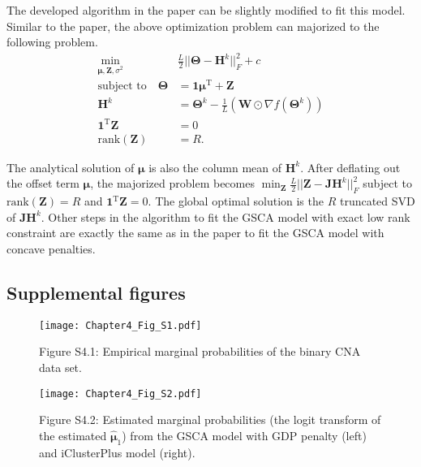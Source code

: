 The developed algorithm in the paper can be slightly modified to fit this model. Similar to the paper, the above optimization problem can majorized to the following problem.
\begin{equation*}
\begin{aligned}
          \min_{\bm{\mu},\mathbf{Z},\sigma^2} \quad & \frac{L}{2} ||\mathbf{\Theta} - \mathbf{H}^k||_F^2+ c\\
     \text{subject to} \quad   \mathbf{\Theta} &= \mathbf{1}\bm{\mu}^{\text{T}} + \mathbf{Z} \\
         \mathbf{H}^k &= \mathbf{\Theta}^k - \frac{1}{L} (\mathbf{W} \odot \nabla f(\mathbf{\Theta}^k))\\
            \mathbf{1}^{\text{T}}\mathbf{Z} &= 0 \\
             \text{rank}(\mathbf{Z}) &= R.
\end{aligned}
\end{equation*}

The analytical solution of $\bm{\mu}$ is also the column mean of $\mathbf{H}^k$. After deflating out the offset term $\bm{\mu}$, the majorized problem becomes $\min_{\mathbf{Z}} \frac{L}{2} ||\mathbf{Z} - \mathbf{J} \mathbf{H}^k||_F^2$ subject to $\text{rank}(\mathbf{Z}) = R$ and $\mathbf{1}^{\text{T}}\mathbf{Z} = 0$. The global optimal solution is the $R$ truncated SVD of $\mathbf{J} \mathbf{H}^k$. Other steps in the algorithm to fit the GSCA model with exact low rank constraint are exactly the same as in the paper to fit the GSCA model with concave penalties.

\subsection{Supplemental figures}
\begin{figure}[htbp]
    \centering
    \texttt{[image: Chapter4\_Fig\_S1.pdf]}
    \caption*{Figure S4.1: Empirical marginal probabilities of the binary CNA data set.}
	\label{chapter4_fig:S1}
\end{figure}

\begin{figure}[htbp]
    \centering
    \texttt{[image: Chapter4\_Fig\_S2.pdf]}
    \caption*{Figure S4.2: Estimated marginal probabilities (the logit transform of the estimated $\hat{\bm{\mu}}_1$) from the GSCA model with GDP penalty (left) and iClusterPlus model (right).}
	\label{chapter4_fig:S2}
\end{figure}

